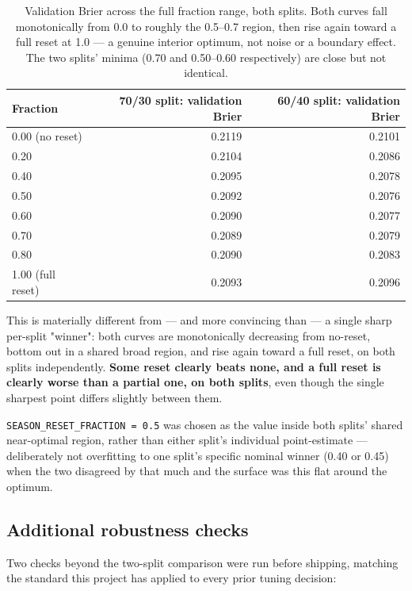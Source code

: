\documentclass[11pt]{article}
\newcommand{\code}[1]{\allowbreak\texttt{\small #1}\allowbreak}
\begin{document}
\begin{table}[h]
\centering
\small
\begin{tabular}{lrr}
\toprule
Fraction & 70/30 split: validation Brier & 60/40 split: validation Brier \\
\midrule
0.00 (no reset) & 0.2119 & 0.2101 \\
0.20            & 0.2104 & 0.2086 \\
0.40            & 0.2095 & 0.2078 \\
0.50            & 0.2092 & 0.2076 \\
0.60            & 0.2090 & 0.2077 \\
0.70            & 0.2089 & 0.2079 \\
0.80            & 0.2090 & 0.2083 \\
1.00 (full reset) & 0.2093 & 0.2096 \\
\bottomrule
\end{tabular}
\caption{Validation Brier across the full fraction range, both splits. Both curves fall monotonically from
0.0 to roughly the 0.5–0.7 region, then rise again toward a full reset at 1.0 — a genuine interior optimum,
not noise or a boundary effect. The two splits' minima (0.70 and 0.50–0.60 respectively) are close but not
identical.}
\end{table}

This is materially different from — and more convincing than — a single sharp per-split "winner": both
curves are monotonically decreasing from no-reset, bottom out in a shared broad region, and rise again toward
a full reset, on both splits independently. \textbf{Some reset clearly beats none, and a full reset is
clearly worse than a partial one, on both splits}, even though the single sharpest point differs slightly
between them.

\code{SEASON\_RESET\_FRACTION = 0.5} was chosen as the value inside both splits' shared near-optimal region,
rather than either split's individual point-estimate — deliberately not overfitting to one split's specific
nominal winner (0.40 or 0.45) when the two disagreed by that much and the surface was this flat around the
optimum.

\subsection{Additional robustness checks}

Two checks beyond the two-split comparison were run before shipping, matching the standard this project has
applied to every prior tuning decision:
\end{document}
